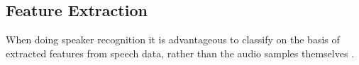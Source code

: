 \subsection*{Feature Extraction}
When doing speaker recognition it is advantageous to classify on the basis of extracted features from speech data, rather than the audio samples themselves \cite{Springer:36}.


